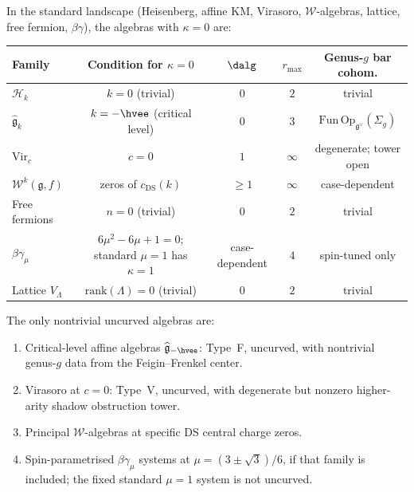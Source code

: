 \documentclass[11pt]{article}
\newcommand{\cW}{\mathcal{W}}
\newcommand{\cH}{\mathcal{H}}
\newcommand{\fg}{\mathfrak{g}}
\begin{document}
\begin{proposition}
\label{prop:uncurved-locus-complete}
In the standard landscape (Heisenberg, affine KM, Virasoro,
$\cW$-algebras, lattice, free fermion, $\beta\gamma$), the
algebras with $\kappa = 0$ are:
\begin{center}
\renewcommand{\arraystretch}{1.3}
\begin{tabular}{lcccc}
\textbf{Family} & \textbf{Condition for $\kappa = 0$}
  & $\boldsymbol{\dalg}$ & \textbf{$r_{\max}$}
  & \textbf{Genus-$g$ bar cohom.} \\
\hline
$\cH_k$ & $k = 0$ (trivial) & $0$ & $2$
  & trivial \\
$\widehat{\fg}_k$ & $k = -\hvee$ (critical level)
  & $0$ & $3$
  & $\mathrm{Fun}\,\mathrm{Op}_{\fg^\vee}(\Sigma_g)$ \\
$\mathrm{Vir}_c$ & $c = 0$ & $1$ & $\infty$
  & degenerate; tower open \\
$\cW^k(\fg, f)$ & zeros of $c_{\mathrm{DS}}(k)$
  & $\geq 1$ & $\infty$
  & case-dependent \\
Free fermions & $n = 0$ (trivial) & $0$ & $2$
  & trivial \\
$\beta\gamma_\mu$ & $6\mu^2-6\mu+1=0$; standard $\mu=1$ has
  $\kappa=1$ & case-dependent & $4$
  & spin-tuned only \\
Lattice $V_\Lambda$ & $\mathrm{rank}(\Lambda) = 0$ (trivial)
  & $0$ & $2$
  & trivial
\end{tabular}
\end{center}
The only nontrivial uncurved algebras are:
\begin{enumerate}[label=\textup{(\roman*)}]
\item Critical-level affine algebras
  $\widehat{\fg}_{-\hvee}$: Type~F, uncurved, with
  nontrivial genus-$g$ data from the Feigin--Frenkel center.
\item Virasoro at $c = 0$: Type~V, uncurved, with degenerate
  but nonzero higher-arity shadow obstruction tower.
\item Principal $\cW$-algebras at specific DS central charge zeros.
\item Spin-parametrised $\beta\gamma_\mu$ systems at
  $\mu=(3\pm\sqrt3)/6$, if that family is included; the fixed
  standard $\mu=1$ system is not uncurved.
\end{enumerate}
\end{proposition}
\end{document}
